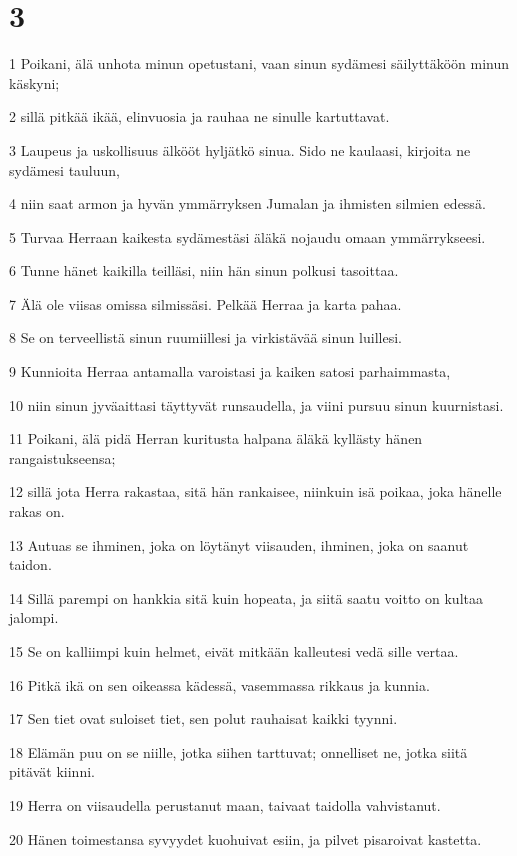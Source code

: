 \chapter{3}

\par 1 Poikani, älä unhota minun opetustani, vaan sinun sydämesi säilyttäköön minun käskyni;
\par 2 sillä pitkää ikää, elinvuosia ja rauhaa ne sinulle kartuttavat.
\par 3 Laupeus ja uskollisuus älkööt hyljätkö sinua. Sido ne kaulaasi, kirjoita ne sydämesi tauluun,
\par 4 niin saat armon ja hyvän ymmärryksen Jumalan ja ihmisten silmien edessä.
\par 5 Turvaa Herraan kaikesta sydämestäsi äläkä nojaudu omaan ymmärrykseesi.
\par 6 Tunne hänet kaikilla teilläsi, niin hän sinun polkusi tasoittaa.
\par 7 Älä ole viisas omissa silmissäsi. Pelkää Herraa ja karta pahaa.
\par 8 Se on terveellistä sinun ruumiillesi ja virkistävää sinun luillesi.
\par 9 Kunnioita Herraa antamalla varoistasi ja kaiken satosi parhaimmasta,
\par 10 niin sinun jyväaittasi täyttyvät runsaudella, ja viini pursuu sinun kuurnistasi.
\par 11 Poikani, älä pidä Herran kuritusta halpana äläkä kyllästy hänen rangaistukseensa;
\par 12 sillä jota Herra rakastaa, sitä hän rankaisee, niinkuin isä poikaa, joka hänelle rakas on.
\par 13 Autuas se ihminen, joka on löytänyt viisauden, ihminen, joka on saanut taidon.
\par 14 Sillä parempi on hankkia sitä kuin hopeata, ja siitä saatu voitto on kultaa jalompi.
\par 15 Se on kalliimpi kuin helmet, eivät mitkään kalleutesi vedä sille vertaa.
\par 16 Pitkä ikä on sen oikeassa kädessä, vasemmassa rikkaus ja kunnia.
\par 17 Sen tiet ovat suloiset tiet, sen polut rauhaisat kaikki tyynni.
\par 18 Elämän puu on se niille, jotka siihen tarttuvat; onnelliset ne, jotka siitä pitävät kiinni.
\par 19 Herra on viisaudella perustanut maan, taivaat taidolla vahvistanut.
\par 20 Hänen toimestansa syvyydet kuohuivat esiin, ja pilvet pisaroivat kastetta.
